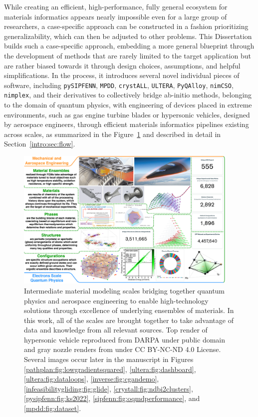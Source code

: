 While creating an efficient, high-performance, fully general ecosystem for materials informatics appears nearly impossible even for a large group of researchers, a case-specific approach can be constructed in a fashion prioritizing generalizability, which can then be adjusted to other problems. This Dissertation builds such a case-specific approach, embedding a more general blueprint through the development of methods that are rarely limited to the target application but are rather biased towards it through design choices, assumptions, and helpful simplifications. In the process, it introduces several novel individual pieces of software, including \texttt{pySIPFENN}, \texttt{MPDD}, \texttt{crystALL}, \texttt{ULTERA}, \texttt{PyQAlloy}, \texttt{nimCSO}, \texttt{nimplex}, and their derivatives to collectively bridge ab-initio methods, belonging to the domain of quantum physics, with engineering of devices placed in extreme environments, such as gas engine turbine blades or hypersonic vehicles, designed by aerospace engineers, through efficient materials informatics pipelines existing across scales, as summarized in the Figure~\ref{intro:fig:bigpicture} and described in detail in Section~\ref{intro:sec:flow}.

\begin{figure}[H]
    \centering
    \includegraphics[width=0.95\textwidth]{intro/DissertationBigPicture.png}
    \caption{
    Intermediate material modeling scales bridging together quantum physics and aerospace engineering to enable high-technology solutions through excellence of underlying ensembles of materials. In this work, all of the scales are brought together to take advantage of data and knowledge from all relevant sources. Top render of hypersonic vehicle reproduced from DARPA under public domain and gray nozzle renders from \cite{Hofmann2014DevelopingManufacturing} under CC BY-NC-ND 4.0 License. Several images occur later in the manuscript in Figures \ref{pathplan:fig:lowgradientsquared}, \ref{ultera:fig:dashboard}, \ref{ultera:fig:dataloops}, \ref{inverse:fig:cgandemo}, \ref{infeasibilitygliding:fig:glide}, \ref{crystall:fig:ndbi2clusters}, \ref{pysipfenn:fig:ks2022}, \ref{sipfenn:fig:oqmdperformance}, and \ref{mpdd:fig:dataset}.
    }
    \label{intro:fig:bigpicture}
\end{figure}

